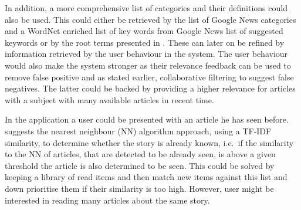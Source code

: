 In addition, a more comprehensive list of categories and their definitions could also be used. This could either be retrieved by the list of Google News categories and a WordNet enriched list of key words from Google News list of suggested keywords or by the root terms presented in \cite{10-1-1-19-5583}. These can later on be refined by information retrieved by the user behaviour in the system. The user behaviour would also make the system stronger as their relevance feedback can be used to remove false positive and as stated earlier, collaborative filtering to suggest false negatives. The latter could be backed by providing a higher relevance for articles with a subject with many available articles in recent time.

In the application a user could be presented with an article he has seen before. \cite{User-Modeling-for-Adaptive-News-Access.pdf} suggests the nearest neighbour (NN) algorithm approach, using a TF-IDF similarity, to determine whether the story is already known, i.e.\ if the similarity to the NN of articles, that are detected to be already seen, is above a given threshold the article is also determined to be seen. This could be solved by keeping a library of read items and then match new items against this list and down prioritise them if their similarity is too high. However, user might be interested in reading many articles about the same story.

